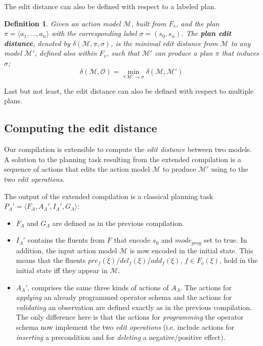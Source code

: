 \documentclass[3p,times]{elsarticle}
\newtheorem{mydefinition}[mytheorem]{Definition}
\newcommand{\tup}[1]{{\langle #1 \rangle}}
\begin{document}
The edit distance can also be defined with respect to a labeled plan. 

\begin{mydefinition}
  Given an action model $\mathcal{M}$, built from $F_v$, and the plan $\pi=\tup{a_1, \ldots, a_n}$  with the corresponding label $\sigma=(s_0,s_{n})$. The {\bf plan edit distance}, denoted by  $\delta(\mathcal{M},\mathcal{\pi},\mathcal{\sigma})$, is the minimal edit distance from $\mathcal{M}$ to any model $\mathcal{M}'$, defined also within $F_v$, such that $\mathcal{M}'$ can produce a plan $\pi$ that induces $\sigma$; \[\delta(\mathcal{M},\mathcal{O})=\min_{\forall \mathcal{M}' \rightarrow \mathcal{\sigma}} \delta(\mathcal{M},\mathcal{M}')\]
\end{mydefinition}

Last but not least, the edit distance can also be defined with respect to multiple plans. 

\subsection{Computing the edit distance}

Our compilation is extensible to compute the {\em edit distance} between two models. A solution to the planning task resulting from the extended compilation is a sequence of actions that edits the action model $\mathcal{M}$ to  produce $\mathcal{M}'$ using to the two {\em edit operations}.

The output of the extended compilation is a classical planning task $P_{\Lambda}'=\tup{F_{\Lambda},A_{\Lambda}',I_{\Lambda}',G_{\Lambda}}$:

\begin{itemize}
\item $F_{\Lambda}$ and $G_{\Lambda}$ are defined as in the previous compilation.
\item $I_{\Lambda}'$ contains the fluents from $F$ that encode $s_0$ and $mode_{prog}$ set to true. In addition, the input action model $\mathcal{M}$ is now encoded in the initial state. This means that the fluents $pre_f(\xi)/del_f(\xi)/add_f(\xi)$, $f\in F_v(\xi)$, hold in the initial state iff they appear in $\mathcal{M}$.
\item $A_{\Lambda}'$, comprises the same three kinds of actions of $A_{\Lambda}$. The actions for {\em applying} an already programmed operator schema and the actions for {\em validating} an observation are defined exactly as in the previous compilation. The only difference here is that the actions for {\em programming} the operator schema now implement the two {\em edit operations} (i.e. include actions for {\em inserting} a precondition and for {\em deleting} a negative/positive effect).
\end{itemize}
\end{document}
